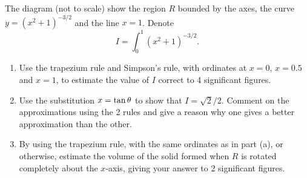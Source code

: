 \clearpage
\begin{problem}
    \begin{center}
    \end{center}

    The diagram (not to scale) show the region $R$ bounded by the axes, the curve $y = (x^2 + 1)^{-3/2}$ and the line $x = 1$. Denote \[I = \int_0^1 (x^2 + 1)^{-3/2}.\]

    \begin{enumerate}
        \item Use the trapezium rule and Simpson's rule, with ordinates at $x = 0$, $x = 0.5$ and $x = 1$, to estimate the value of $I$ correct to 4 significant figures.
        \item Use the substitution $x = \tan \theta$ to show that $I = \sqrt{2}/2$.
        Comment on the approximations using the 2 rules and give a reason why one gives a better approximation than the other.
        \item By using the trapezium rule, with the same ordinates as in part (a), or otherwise, estimate the volume of the solid formed when $R$ is rotated completely about the $x$-axis, giving your answer to 2 significant figures.
    \end{enumerate}
\end{problem}
